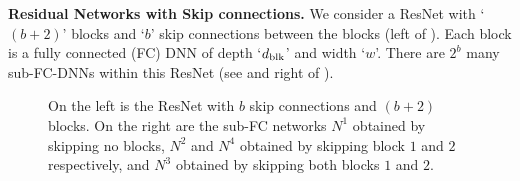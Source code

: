 \textbf{Residual Networks with Skip connections.} We consider a ResNet with `$(b+2)$' blocks and `$b$' skip connections between the blocks (left of ). Each block is a fully connected (FC) DNN of depth `$d_{\text{blk}}$' and width `$w$'. There are $2^b$ many sub-FC-DNNs within this ResNet (see  and right of ).
\begin{figure}[t]
\begin{minipage}{0.5\columnwidth}
\end{minipage}
\begin{minipage}{0.5\columnwidth}
\end{minipage}
\caption{\small{On the left is the ResNet with $b$ skip connections and $(b+2)$ blocks. On the right are the sub-FC networks $N^1$ obtained by skipping no blocks, $N^2$ and $N^4$ obtained by skipping block $1$ and $2$ respectively, and $N^3$ obtained by skipping both blocks $1$ and $2$.}}
\label{fig:resnet}
\end{figure}

